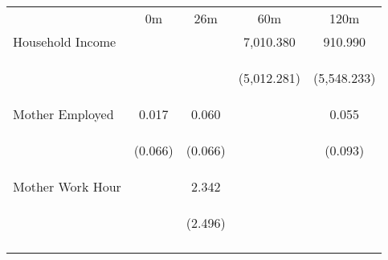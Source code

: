 \begin{tabular}{lcccc}
\hline \noalign{\smallskip} & 0m & 26m & 60m & 120m\\
\noalign{\smallskip}\hline \noalign{\smallskip}Household Income &  &  & 7,010.380 & 910.990\\
 & \begin{footnotesize}\end{footnotesize} & \begin{footnotesize}\end{footnotesize} & \begin{footnotesize}(5,012.281)\end{footnotesize} & \begin{footnotesize}(5,548.233)\end{footnotesize}\\
\noalign{\smallskip}Mother Employed & 0.017 & 0.060 &  & 0.055\\
 & \begin{footnotesize}(0.066)\end{footnotesize} & \begin{footnotesize}(0.066)\end{footnotesize} & \begin{footnotesize}\end{footnotesize} & \begin{footnotesize}(0.093)\end{footnotesize}\\
\noalign{\smallskip}Mother Work Hour &  & 2.342 &  & \\
 & \begin{footnotesize}\end{footnotesize} & \begin{footnotesize}(2.496)\end{footnotesize} & \begin{footnotesize}\end{footnotesize} & \begin{footnotesize}\end{footnotesize}\\
\noalign{\smallskip}\hline\end{tabular}\\

